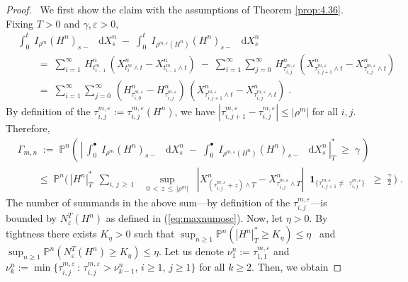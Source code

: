 \documentclass[11pt]{article}
\theoremstyle{definition}\newtheorem{example}[theorem]{Example}
\theoremstyle{definition}\newtheorem{counterexample}[theorem]{Counterexample}
\theoremstyle{definition}\newtheorem{remark}[theorem]{Remark}
\theoremstyle{definition}\newtheorem{defi}[theorem]{Definition}
\numberwithin{equation}{section}
\newcommand*\diff{\mathop{}\!\mathrm{d}}								%
\newcommand{\Pro}{\mathbb{P}}										%
\newcommand{\ind}{\operatorname{\mathbf{1}}}							%
\renewcommand{\sup}[1]{\underset{#1}{\operatorname{sup}}\;}					%
\renewcommand{\|}{\; : \, \;}											%
\begin{document}
\begin{proof}\ 
	We first show the claim with the assumptions of Theorem \ref{prop:4.36}. Fixing $T>0$ and $\gamma, \varepsilon>0$,
	\begin{align*}
		&\int_0^t \; I_{\rho^m}(H^n)_{s-} \; \diff X^n_s \; - \; \int_0^t \; I_{\rho^{m,\varepsilon}(H^n)}(H^n)_{s-} \; \diff X^n_{s} \\
		& \qquad = \; \sum_{i=1}^{\infty} \, H_{t^m_{i-1}}^n \, \left( X^n_{t^m_{i}\wedge t} -X^n_{t^m_{i-1}\wedge t}\right) \; - \; \sum_{i=1}^{\infty}\sum_{j=0}^{\infty}\, H_{\tau^{m,\varepsilon}_{i,j}}^n \, \left( X^n_{\tau^{m,\varepsilon}_{i,j+1}\wedge t} -X^n_{\tau^{m,\varepsilon}_{i,j}\wedge t}\right) \\
		& \qquad = \;\sum_{i=1}^{\infty}\sum_{j=0}^{\infty} \, \left(H_{\tau^{m,\varepsilon}_{i,0}}^n - H_{\tau^{m,\varepsilon}_{i,j}}^n \right)\, \left( X^n_{\tau^{m,\varepsilon}_{i,j+1}\wedge t} -X^n_{\tau^{m,\varepsilon}_{i,j}\wedge t}\right) \; .
	\end{align*}
	By definition of the $\tau^{m,\varepsilon}_{i,j}:=\tau^{m,\varepsilon}_{i,j}(H^n)$, we have $|\tau^{m,\varepsilon}_{i,j+1} - \tau^{m,\varepsilon}_{i,j}| \le |\rho^m|$ for all $i,j$. Therefore,
	\begin{align*}
		&\Gamma_{m,n} \;:= \;\Pro^n \left( \, \left| \, \int_0^\bullet \; I_{\rho^m}(H^n)_{s-} \; \diff X^n_s \; - \; \int_0^\bullet \; I_{\rho^{m,\varepsilon}(H^n)}(H^n)_{s-} \; \diff X^n_s\, \right|_T^* \; \ge \; \gamma\,  \right) \\
		& \qquad \le \; \Pro^n \Big( \, \left| H^n\right|_T^*\; \,\sum_{i,\, j \, \ge \, 1 }\; \; \, \sup{0\, < \, z \, \le \, |\rho^m|} \; \left| X^n_{(\tau^{m,\varepsilon}_{i,j}+z)\wedge T} -X^n_{\tau^{m,\varepsilon}_{i,j}\wedge T}\right| \; \ind_{\{\tau^{m,\varepsilon}_{i,j+1} \neq \; \, \tau^{m,\varepsilon}_{i,j}\}}\; \ge \; \frac{\gamma}{2}\,  \Big) \; . 
	\end{align*}
	The number of summands in the above sum---by definition of the $\tau^{m,\varepsilon}_{i,j}$---is bounded by $N^T_\varepsilon(H^n)$ as defined in (\ref{eq:maxnumosc}). Now, let $\eta>0$. By tightness there exists $K_\eta>0$ such that $\operatorname{sup}_{n\ge 1} \Pro^n ( \left| H^n\right|_T^*  \ge  K_\eta ) \le \eta$ \, and \, $\operatorname{sup}_{n\ge 1}\Pro^n ( N^T_\varepsilon(H^n) \ge K_\eta)\le \eta$. Let us denote $\nu^{n}_1:= \tau^{m,\varepsilon}_{1,1}$ and $\nu^{n}_{k}:= \operatorname{min}\{ \tau^{m,\varepsilon}_{i,j} \, : \, \tau^{m,\varepsilon}_{i,j} > \nu^{n}_{k-1}, \, i\ge 1, \, j\ge 1\}$ for all $k\ge 2$. Then, we obtain

\end{proof}
\end{document}

